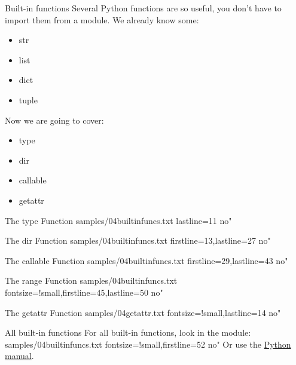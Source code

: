\documentclass{pyslides}
\begin{document}
\begin{frame}[fragile]{Built-in functions}
Several Python functions are so useful, you don't have to import them from a module. We already know some:
\begin{itemize}
\item str
\item list
\item dict
\item tuple
\end{itemize}
Now we are going to cover:
\begin{itemize}
\item type
\item dir
\item callable
\item getattr
\end{itemize}
\end{frame}

\begin{frame}[fragile]{The type Function}
 samples/04builtinfuncs.txt lastline=11 no"
\end{frame}

\begin{frame}[fragile]{The dir Function}
 samples/04builtinfuncs.txt firstline=13,lastline=27 no"
\end{frame}

\begin{frame}[fragile]{The callable Function}
 samples/04builtinfuncs.txt firstline=29,lastline=43 no"
\end{frame}

\begin{frame}[fragile]{The range Function}
 samples/04builtinfuncs.txt fontsize=!small,firstline=45,lastline=50 no"
\end{frame}

\begin{frame}[fragile]{The getattr Function}
 samples/04getattr.txt fontsize=!small,lastline=14 no"
\end{frame}

\begin{frame}[fragile]{All built-in functions}
For all built-in functions, look in the {\tt{}} module:
 samples/04builtinfuncs.txt fontsize=!small,firstline=52 no"
\bigskip
Or use the \href{http://docs.python.org/library/functions.html}{Python manual}.
\end{frame}
\end{document}
